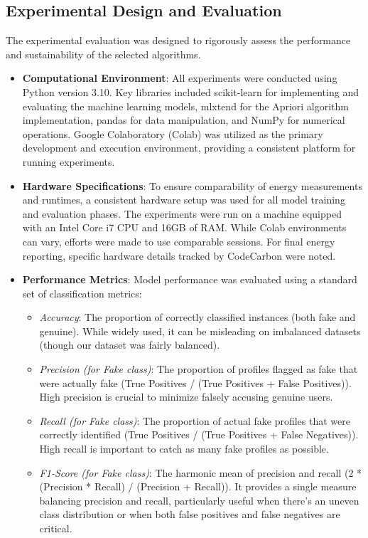 \documentclass[conference]{IEEEtran}
\begin{document}
\subsection{Experimental Design and Evaluation}
The experimental evaluation was designed to rigorously assess the performance and sustainability of the selected algorithms.
\begin{itemize}
    \item \textbf{Computational Environment}: All experiments were conducted using Python version 3.10. Key libraries included scikit-learn for implementing and evaluating the machine learning models, mlxtend for the Apriori algorithm implementation, pandas for data manipulation, and NumPy for numerical operations. Google Colaboratory (Colab) was utilized as the primary development and execution environment, providing a consistent platform for running experiments.
    \item \textbf{Hardware Specifications}: To ensure comparability of energy measurements and runtimes, a consistent hardware setup was used for all model training and evaluation phases. The experiments were run on a machine equipped with an Intel Core i7 CPU and 16GB of RAM. While Colab environments can vary, efforts were made to use comparable sessions. For final energy reporting, specific hardware details tracked by CodeCarbon were noted.
    \item \textbf{Performance Metrics}: Model performance was evaluated using a standard set of classification metrics:
        \begin{itemize}
            \item \textit{Accuracy}: The proportion of correctly classified instances (both fake and genuine). While widely used, it can be misleading on imbalanced datasets (though our dataset was fairly balanced).
            \item \textit{Precision (for Fake class)}: The proportion of profiles flagged as fake that were actually fake (True Positives / (True Positives + False Positives)). High precision is crucial to minimize falsely accusing genuine users.
            \item \textit{Recall (for Fake class)}: The proportion of actual fake profiles that were correctly identified (True Positives / (True Positives + False Negatives)). High recall is important to catch as many fake profiles as possible.
            \item \textit{F1-Score (for Fake class)}: The harmonic mean of precision and recall (2 * (Precision * Recall) / (Precision + Recall)). It provides a single measure balancing precision and recall, particularly useful when there's an uneven class distribution or when both false positives and false negatives are critical.

\end{itemize}
\end{itemize}
\end{document}
